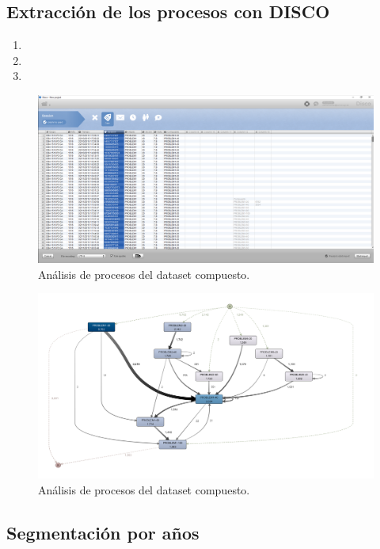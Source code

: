 \subsection{Extracción de los procesos con DISCO}

\begin{enumerate}
\item
\item
\item
\end{enumerate}

\begin{figure}[H]
    \centering
    \includegraphics[width=1.25\textwidth]{imagenes/DISCO.png}
    \caption{Análisis de procesos del dataset compuesto.}
    \label{fig:DISCO}
\end{figure}

\begin{figure}[H]
    \centering
    \includegraphics[width=1.25\textwidth]{imagenes/Dataset Fusionado - Compuesto.png}
    \caption{Análisis de procesos del dataset compuesto.}
    \label{fig:datasetFusionado}
\end{figure}

\subsection{Segmentación por años}


